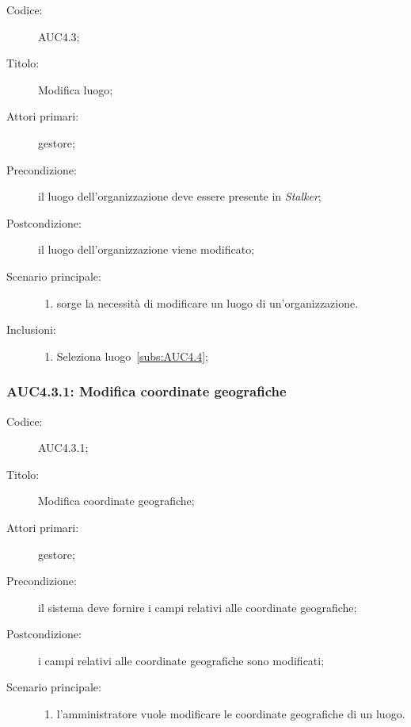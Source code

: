 \begin{description}
  \item[Codice:] AUC4.3;
  \item[Titolo:] Modifica luogo;
  \item[Attori primari:] gestore;
  \item[Precondizione:] il luogo dell'organizzazione deve essere presente in \emph{Stalker};
  \item[Postcondizione:] il luogo dell'organizzazione viene modificato;
  \item[Scenario principale:]
  \begin{enumerate}
    \item sorge la necessità di modificare un luogo di un'organizzazione.
  \end{enumerate}
  \item[Inclusioni:]
  \begin{enumerate}
    \item Seleziona luogo~\ref{subs:AUC4.4};
  \end{enumerate}
\end{description}

\subsubsection{AUC4.3.1: Modifica coordinate geografiche}%
\label{subs:AUC4.3.1}
\begin{description}
  \item[Codice:] AUC4.3.1;
  \item[Titolo:] Modifica coordinate geografiche;
  \item[Attori primari:] gestore;
  \item[Precondizione:] il sistema deve fornire i campi relativi alle coordinate geografiche;
  \item[Postcondizione:] i campi relativi alle coordinate geografiche sono modificati;
  \item[Scenario principale:]
  \begin{enumerate}
    \item l'amministratore vuole modificare le coordinate geografiche di un luogo.
  \end{enumerate}
\end{description}

